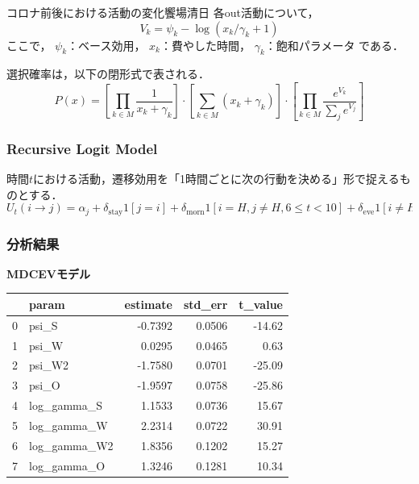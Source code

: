 \begin{column}{コロナ前後における活動の変化}{饗場清日}
各out活動について，
\begin{equation}
V_k = \psi_k - \log(x_k / \gamma_k + 1)
\end{equation}
ここで，
$\psi_k$：ベース効用，
$x_k$：費やした時間，
$\gamma_k$：飽和パラメータ
である．

選択確率は，以下の閉形式で表される．
\begin{equation}
P(x) = 
\left[ \prod_{k \in M} \frac{1}{x_k + \gamma_k} \right]
\cdot
\left[ \sum_{k \in M} (x_k + \gamma_k) \right]
\cdot
\left[ \prod_{k \in M} \frac{e^{V_k}}{\sum_j e^{V_j}} \right]
\end{equation}

\subsubsection{Recursive Logit Model}

時間$t$における活動，遷移効用を「1時間ごとに次の行動を決める」形で捉えるものとする．
\begin{equation}
U_t(i \to j) =
\alpha_j
+ \delta_{\text{stay}} 1[j = i]
+ \delta_{\text{morn}} 1[i = H, j \neq H, 6 \leq t < 10]
+ \delta_{\text{eve}} 1[i \neq H, j = H, 17 \leq t < 22]
\end{equation}

\subsubsection{分析結果}

\textbf{MDCEVモデル}

\begin{center}
  \renewcommand{\arraystretch}{1.5}
  \setlength{\tabcolsep}{14pt}

  \begin{tabular}{clrrr}
    \toprule
    & \textbf{param} & \textbf{estimate} & \textbf{std\_err} & \textbf{t\_value} \\
    \midrule
    0 & psi\_S           & -0.7392 & 0.0506 & -14.62 \\
    1 & psi\_W           &  0.0295 & 0.0465 &   0.63 \\
    2 & psi\_W2          & -1.7580 & 0.0701 & -25.09 \\
    3 & psi\_O           & -1.9597 & 0.0758 & -25.86 \\
    4 & log\_gamma\_S    &  1.1533 & 0.0736 &  15.67 \\
    5 & log\_gamma\_W    &  2.2314 & 0.0722 &  30.91 \\
    6 & log\_gamma\_W2   &  1.8356 & 0.1202 &  15.27 \\
    7 & log\_gamma\_O    &  1.3246 & 0.1281 &  10.34 \\
    \bottomrule
  \end{tabular}
  \label{tab:mdcev-pre-covid}
\end{center}


\end{column}
